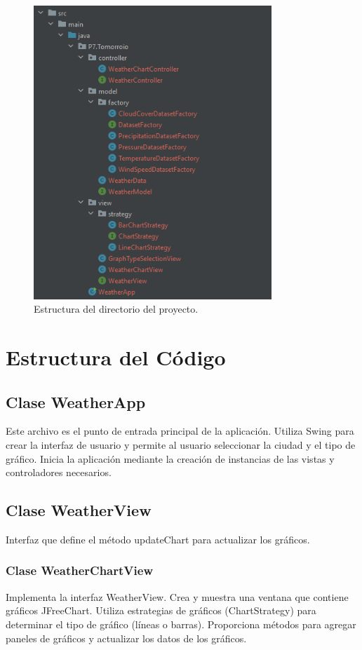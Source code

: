 \documentclass{article}
\begin{document}
\begin{figure}[H]
  \centering
  \includegraphics[width=0.8\textwidth]{images/image6.png}
  \caption{Estructura del directorio del proyecto.}
  \label{fig:estructura-proyecto}
\end{figure}

\section{Estructura del Código}
\subsection{Clase WeatherApp}
Este archivo es el punto de entrada principal de la aplicación. Utiliza Swing para crear la interfaz de usuario y permite al usuario seleccionar la ciudad y el tipo de gráfico. Inicia la aplicación mediante la creación de instancias de las vistas y controladores necesarios.

\subsection{Clase WeatherView}
Interfaz que define el método updateChart para actualizar los gráficos.

\subsubsection{Clase WeatherChartView}
Implementa la interfaz WeatherView. Crea y muestra una ventana que contiene gráficos JFreeChart. Utiliza estrategias de gráficos (ChartStrategy) para determinar el tipo de gráfico (líneas o barras). Proporciona métodos para agregar paneles de gráficos y actualizar los datos de los gráficos.
\end{document}
